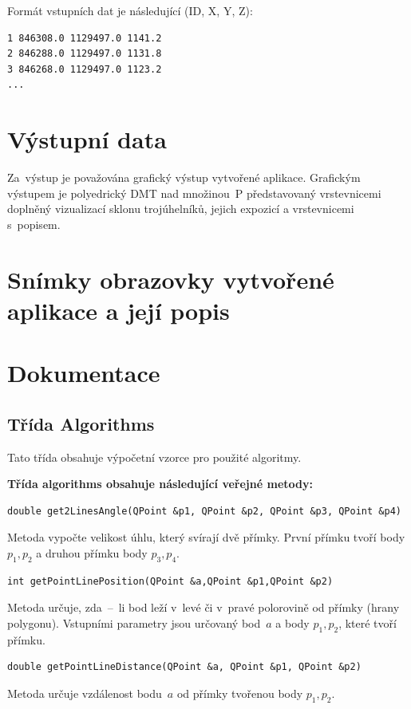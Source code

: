 \documentclass[a4paper, 12pt, oneside, titlepage]{article} %
\begin{document}
Formát vstupních dat je následující (ID, X, Y, Z):
\begin{verbatim}
1 846308.0 1129497.0 1141.2
2 846288.0 1129497.0 1131.8
3 846268.0 1129497.0 1123.2
...
\end{verbatim}


\section{Výstupní data}
Za~výstup je považována grafický výstup vytvořené aplikace. Grafickým výstupem je polyedrický DMT nad množinou~P představovaný vrstevnicemi doplněný vizualizací sklonu trojúhelníků, jejich expozicí a vrstevnicemi s~popisem. 


\section{Snímky obrazovky vytvořené aplikace a její popis}



\section{Dokumentace}
\subsection{Třída Algorithms}
Tato třída obsahuje výpočetní vzorce pro použité algoritmy.

\textbf{Třída algorithms obsahuje následující veřejné metody:}

\begin{verbatim}
double get2LinesAngle(QPoint &p1, QPoint &p2, QPoint &p3, QPoint &p4)
\end{verbatim}
Metoda vypočte velikost úhlu, který svírají dvě přímky. První přímku tvoří body $p_1, p_2$ a druhou přímku body $p_3, p_4$.\\

\begin{verbatim}
int getPointLinePosition(QPoint &a,QPoint &p1,QPoint &p2)
\end{verbatim}
Metoda určuje, zda~--~li bod leží v~levé či v~pravé polorovině od přímky (hrany polygonu). Vstupními parametry jsou určovaný bod~$a$ a body $p_1, p_2$, které tvoří přímku.\\

\begin{verbatim}
double getPointLineDistance(QPoint &a, QPoint &p1, QPoint &p2)
\end{verbatim}
Metoda určuje vzdálenost bodu~$a$ od přímky tvořenou body $p_1, p_2$.\\
\end{document}
